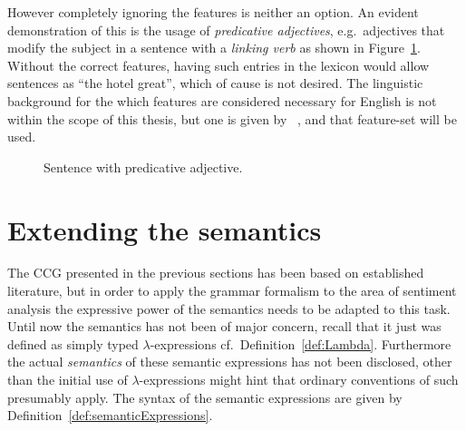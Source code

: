 However completely ignoring the features is neither an option. An evident demonstration of this is the usage of \emph{predicative adjectives}, e.g.\ adjectives that modify the subject in a sentence with a \emph{linking verb} as shown in Figure~\ref{fig:predicateAdj}. Without the correct features, having such entries in the lexicon would allow sentences as ``the hotel great'', which of cause is not desired. The linguistic background for the which features are considered necessary for English is not within the scope of this thesis, but one is given by \citeauthor{juliaThesis}~, and that feature-set will be used.
\begin{figure}[ht]
\center
{}
\caption{Sentence with predicative adjective.}
\label{fig:predicateAdj}
\end{figure}

\section{Extending the semantics}
\label{sec:extendingSemantics}
The CCG presented in the previous sections has been based on established literature, but in order to apply the grammar formalism to the area of sentiment analysis the expressive power of the semantics needs to be adapted to this task. Until now the semantics has not been of major concern, recall that it just was defined as simply typed $\lambda$-expressions cf.\ Definition~\ref{def:Lambda}. Furthermore the actual \emph{semantics} of these semantic expressions has not been disclosed, other than the initial use of $\lambda$-expressions might hint that ordinary conventions of such presumably apply. The syntax of the semantic expressions are given by Definition~\ref{def:semanticExpressions}.

